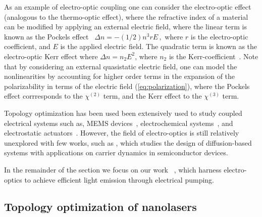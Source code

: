 As an example of electro-optic coupling one can consider the electro-optic effect (analogous to the thermo-optic effect),
where the refractive index of a material can be modified by applying an external electric field, where the linear term is known as the
Pockels effect~\cite{pockels} $
    \Delta n = -(1/2) n^3 r E\,,$
where $r$ is the electro-optic coefficient, and $E$ is the applied electric field. The quadratic term 
is known as the electro-optic Kerr effect where $\Delta n = n_2 E^2$, where $n_2$ is the Kerr-coefficient~\cite{phot_crys}. Note that by considering an external
quasistatic electric field, one can model the nonlinearities by accounting for higher order terms in the expansion of the polarizability
in terms of the electric field (\eqref{eq:polarization}), where the Pockels effect corrresponds to the $\chi^{(2)}$ term, and the Kerr effect to the $\chi^{(3)}$ term.

Topology optimization has been used been extensively used to study coupled electrical systems
such as, MEMS devices~\cite{MEMS_multi}, electrochemical systems~\cite{electrode}, and electrostatic actuators~\cite{electrostatic_act}. However, the field of electro-optics is
still relatively unexplored with few works, such as \cite{g_heat}, which studies the design of diffusion-based systems with applications on
carrier dynamics in semiconductor devices.

In the remainder of the section we focus on our work~\cite{ownpub4} , which harness electro-optics 
to achieve efficient light emission through electrical pumping.

\subsection*{Topology optimization of nanolasers~\cite{ownpub4}}

